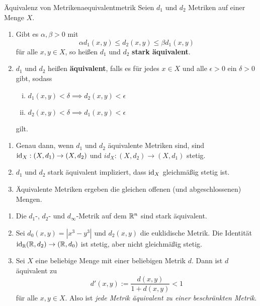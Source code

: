 \begin{definition}{Äquivalenz von Metriken}{aequivalentmetrik}
Seien $d_1$ und $d_2$ Metriken auf einer Menge $X$.
\begin{enumerate}
\item Gibt es $\alpha, \beta > 0$ mit
\begin{equation}
\alpha d_1(x,y) \leq d_2(x,y) \leq \beta d_1(x,y)
\end{equation}
für alle $x,y \in X$, so heißen $d_1$ und $d_2$ \textbf{stark äquivalent}.
\item $d_1$ und $d_2$ heißen \textbf{äquivalent}, falls es für jedes $x \in X$ und alle $\epsilon > 0$ ein $\delta > 0$ gibt, sodass
\begin{enumerate}[(i)]
\item $d_1(x,y) < \delta \implies d_2(x,y) < \epsilon$
\item $d_2(x,y) < \delta \implies d_1(x,y) < \epsilon$
\end{enumerate}
gilt.
\end{enumerate}
\end{definition}
\begin{bemerkungen}
\begin{enumerate}
\item Genau dann, wenn $d_1$ und $d_2$ äquivalente Metriken sind, sind $\text{id}_X: (X, d_1) \to (X, d_2)$ und $id_X: (X,d_2) \to (X, d_1)$ stetig.
\item $d_1$ und $d_2$ stark äquivalent impliziert, dass $\text{id}_X$ gleichmäßig stetig ist.
\item Äquivalente Metriken ergeben die gleichen offenen (und abgeschlossenen) Mengen.
\end{enumerate}
\begin{beispiele}
\begin{enumerate}
\item Die $d_1$-, $d_2$- und $d_\infty$-Metrik auf dem $\mathbb{R}^n$ sind stark äquivalent.
\item Sei $d_0(x,y) = |x^3 - y^3|$ und $d_2(x,y)$ die euklidische Metrik. Die Identität $\text{id}_{\mathbb{R}} (\mathbb{R}, d_2) \to (\mathbb{R}, d_0)$ ist stetig, aber nicht gleichmäßig stetig.
\item Sei $X$ eine beliebige Menge mit einer beliebigen Metrik $d$. Dann ist $d$ äquivalent zu 
\begin{equation}
d'(x,y) := \frac{d(x,y)}{1+d(x,y)} < 1
\end{equation}
für alle $x,y \in X$. Also ist \textit{jede Metrik äquivalent zu einer beschränkten Metrik}.
\end{enumerate}
\end{beispiele}
\end{bemerkungen}
